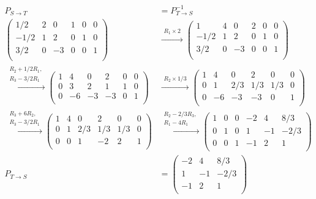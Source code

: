\documentclass[12pt]{article}
\newenvironment{problem}[2][Problem]{\begin{trivlist}
\item[\hskip \labelsep {\bfseries #1}\hskip \labelsep {\bfseries #2.}]}{\end{trivlist}}
\begin{document}
\begin{problem}{1.iii}
\end{problem}
\begin{align*}
P_{S \to T}
&=
P_{T \to S}^{-1}\\
\left( \begin{array}{ccc|ccc}
1/2 & 2 & 0 & 1 & 0 & 0\\ 
-1/2 & 1 & 2 & 0 & 1 & 0\\
3/2 & 0 & -3 & 0 & 0 & 1\\ 
\end{array} \right)
&\xrightarrow{\substack{R_1 \times 2}} 
\left( \begin{array}{ccc|ccc}
1 & 4 & 0 & 2 & 0 & 0\\ 
-1/2 & 1 & 2 & 0 & 1 & 0\\
3/2 & 0 & -3 & 0 & 0 & 1\\ 
\end{array} \right)\\
\xrightarrow{\substack{R_2 + 1/2R_1,\\ R_3 - 3/2R_1}} 
\left( \begin{array}{ccc|ccc}
1 & 4 & 0 & 2 & 0 & 0\\ 
0 & 3 & 2 & 1 & 1 & 0\\
0 & -6 & -3 & -3 & 0 & 1\\ 
\end{array} \right)
&\xrightarrow{\substack{R_2 \times 1/3}} 
\left( \begin{array}{ccc|ccc}
1 & 4 & 0 & 2 & 0 & 0\\ 
0 & 1 & 2/3 & 1/3 & 1/3 & 0\\
0 & -6 & -3 & -3 & 0 & 1\\ 
\end{array} \right)\\
\xrightarrow{\substack{R_3 + 6R_2,\\ R_3 - 3/2R_1}} 
\left( \begin{array}{ccc|ccc}
1 & 4 & 0 & 2 & 0 & 0\\ 
0 & 1 & 2/3 & 1/3 & 1/3 & 0\\
0 & 0 & 1 & -2 & 2 & 1\\ 
\end{array} \right)
&\xrightarrow{\substack{R_2 - 2/3R_3,\\ R_1 - 4R_1}} 
\left( \begin{array}{ccc|ccc}
1 & 0 & 0 & -2 & 4 & 8/3\\ 
0 & 1 & 0 & 1 & -1 & -2/3\\
0 & 0 & 1 & -1 & 2 & 1\\ 
\end{array} \right)\\
P_{T \to S} &= 
\left( \begin{array}{ccc}
-2 & 4 & 8/3\\ 
1 & -1 & -2/3\\
-1 & 2 & 1\\ 
\end{array} \right)
\end{align*}
\filbreak
\end{document}
